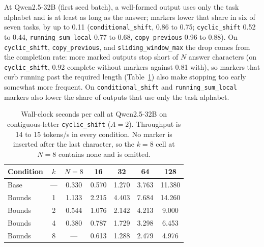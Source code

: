 \documentclass[10pt]{article} %
\newcommand{\task}[1]{\texttt{#1}}
\begin{document}
At Qwen2.5-32B (first seed batch), a well-formed output uses only the task alphabet and is at least as long as the answer; markers lower that share in six of seven tasks, by up to 0.11 (\task{conditional\_shift}, 0.86 to 0.75; \task{cyclic\_shift} 0.52 to 0.44, \task{running\_sum\_local} 0.77 to 0.68, \task{copy\_previous} 0.96 to 0.88). On \task{cyclic\_shift}, \task{copy\_previous}, and \task{sliding\_window\_max} the drop comes from the completion rate: more marked outputs stop short of $N$ answer characters (on \task{cyclic\_shift}, 0.92 complete without markers against 0.81 with), so markers that curb running past the required length (Table~\ref{tab:wallclock}) also make stopping too early somewhat more frequent. On \task{conditional\_shift} and \task{running\_sum\_local} markers also lower the share of outputs that use only the task alphabet.

\begin{table}[!htbp]
\centering
\small
\caption{Exact transformation match (markers and spaces removed from both sides) and marker-placement compliance by model ($N \le 64$, all spacings pooled): the dependency tasks and all task groups weighted by generations, and every task group pooled over models. Exact: the cleaned output equals the answer. Compliant: the raw first line carries markers at exactly the expected offsets, or none for the no-marker runs. For Qwen2.5-7B, 14B, and 32B, Mistral, and Phi the ``Dependency, as is'' rows cover only \task{sliding\_window\_max} (at Phi also \task{copy\_previous}), the dependency runs of those models that store raw output, and the contiguous-letter rows cover only Qwen3.8 and Gemma 4, so the pooled letter row averages over those two models (Appendix~\ref{app:trials}). Because of that, the final block repeats every task group on Qwen3.8 and Gemma 4 alone, which is the comparison to read across formats; the ``All models, weighted'' block mixes a two-model letter row with seven-model spaced and digit rows.}
\label{tab:compliance}
\resizebox{\linewidth}{!}{}
\end{table}

\begin{table}[!htbp]
\centering
\small
\caption{Wall-clock seconds per call at Qwen2.5-32B on contiguous-letter \task{cyclic\_shift} ($A = 2$). Throughput is 14 to 15 tokens/s in every condition. No marker is inserted after the last character, so the $k = 8$ cell at $N = 8$ contains none and is omitted.}
\label{tab:wallclock}
\begin{tabular}{lcccccc}
\toprule
Condition & $k$ & $N=8$ & 16 & 32 & 64 & 128 \\
\midrule
Base & --- & 0.330 & 0.570 & 1.270 & 3.763 & 11.380 \\
Bounds & 1 & 1.133 & 2.215 & 4.403 & 7.684 & 14.260 \\
Bounds & 2 & 0.544 & 1.076 & 2.142 & 4.213 & 9.000 \\
Bounds & 4 & 0.380 & 0.787 & 1.729 & 3.298 & 6.453 \\
Bounds & 8 & --- & 0.613 & 1.288 & 2.479 & 4.976 \\
\bottomrule
\end{tabular}
\end{table}
\end{document}
